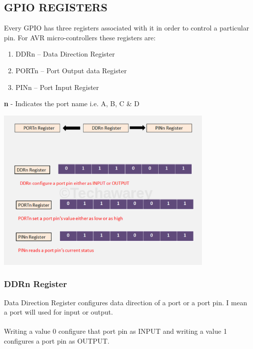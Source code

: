 
\subsection{GPIO REGISTERS}
Every GPIO has three registers associated with it in order to control a particular pin. For AVR micro-controllers these registers are:

\begin{enumerate}
  \item DDRn – Data Direction Register
  \item PORTn – Port Output data Register
  \item PINn – Port Input Register
\end{enumerate}

\textbf{n} - Indicates the port name i.e. A, B, C \& D 
\\

\centerline{
	\includegraphics[width=0.8\textwidth]{overview/images/gpio-registers.png}
}


\subsubsection{DDRn Register}
Data Direction Register configures data direction of a port or a port pin. I mean a port will used for input or output.
\\\\
Writing a value 0 configure that port pin as INPUT and writing a value 1 configures a port pin as OUTPUT.

